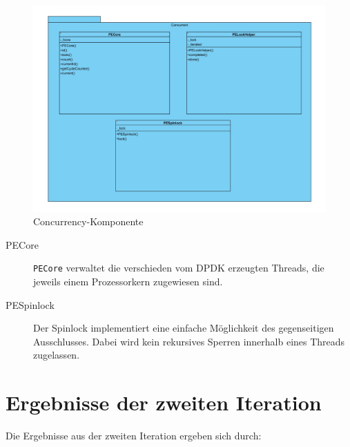 \documentclass[a4paper, 11pt, ngerman, fleqn]{article}
\begin{document}
\begin{figure}
	\begin{center}
		\includegraphics[width=1 \textwidth]{figures/Concurrent.pdf}
		\caption{Concurrency-Komponente}
	\end{center}
\end{figure}

\begin{description}
	\item[PECore] 
	\texttt{PECore} verwaltet die verschieden vom DPDK erzeugten Threads, die jeweils einem Prozessorkern zugewiesen sind.
	
	\item[PESpinlock]
	Der Spinlock implementiert eine einfache Möglichkeit des gegenseitigen Ausschlusses.
	Dabei wird kein rekursives Sperren innerhalb eines Threads zugelassen. 
\end{description}


\clearpage
\section{Ergebnisse der zweiten Iteration} 
Die Ergebnisse aus der zweiten Iteration ergeben sich durch:
\end{document}
